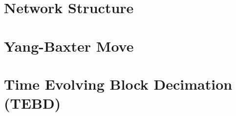 \section{Network Structure}

\section{Yang-Baxter Move}

\section{Time Evolving Block Decimation (TEBD)}